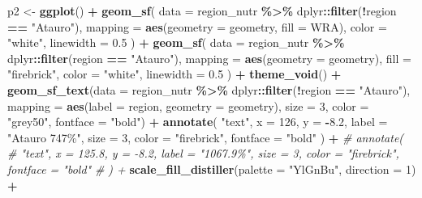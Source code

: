 \documentclass[
]{book}
\newenvironment{Shaded}{\begin{snugshade}}{\end{snugshade}}
\newcommand{\AttributeTok}[1]{\textcolor[rgb]{0.13,0.29,0.53}{#1}}
\newcommand{\CommentTok}[1]{\textcolor[rgb]{0.56,0.35,0.01}{\textit{#1}}}
\newcommand{\DecValTok}[1]{\textcolor[rgb]{0.00,0.00,0.81}{#1}}
\newcommand{\FloatTok}[1]{\textcolor[rgb]{0.00,0.00,0.81}{#1}}
\newcommand{\FunctionTok}[1]{\textcolor[rgb]{0.13,0.29,0.53}{\textbf{#1}}}
\newcommand{\NormalTok}[1]{#1}
\newcommand{\OtherTok}[1]{\textcolor[rgb]{0.56,0.35,0.01}{#1}}
\newcommand{\SpecialCharTok}[1]{\textcolor[rgb]{0.81,0.36,0.00}{\textbf{#1}}}
\newcommand{\StringTok}[1]{\textcolor[rgb]{0.31,0.60,0.02}{#1}}
\begin{document}
\begin{Shaded}
\begin{Highlighting}[]
\NormalTok{p2 }\OtherTok{\textless{}{-}} 
  \FunctionTok{ggplot}\NormalTok{() }\SpecialCharTok{+}
  \FunctionTok{geom\_sf}\NormalTok{(}
    \AttributeTok{data =}\NormalTok{ region\_nutr }\SpecialCharTok{\%\textgreater{}\%}
\NormalTok{      dplyr}\SpecialCharTok{::}\FunctionTok{filter}\NormalTok{(}\SpecialCharTok{!}\NormalTok{region }\SpecialCharTok{==} \StringTok{"Atauro"}\NormalTok{), }\AttributeTok{mapping =} \FunctionTok{aes}\NormalTok{(}\AttributeTok{geometry =}\NormalTok{ geometry, }\AttributeTok{fill =}\NormalTok{ WRA),}
    \AttributeTok{color =} \StringTok{"white"}\NormalTok{, }\AttributeTok{linewidth =} \FloatTok{0.5}
\NormalTok{  ) }\SpecialCharTok{+}
  \FunctionTok{geom\_sf}\NormalTok{(}
    \AttributeTok{data =}\NormalTok{ region\_nutr }\SpecialCharTok{\%\textgreater{}\%}
\NormalTok{      dplyr}\SpecialCharTok{::}\FunctionTok{filter}\NormalTok{(region }\SpecialCharTok{==} \StringTok{"Atauro"}\NormalTok{), }\AttributeTok{mapping =} \FunctionTok{aes}\NormalTok{(}\AttributeTok{geometry =}\NormalTok{ geometry), }\AttributeTok{fill =} \StringTok{"firebrick"}\NormalTok{,}
    \AttributeTok{color =} \StringTok{"white"}\NormalTok{, }\AttributeTok{linewidth =} \FloatTok{0.5}
\NormalTok{  ) }\SpecialCharTok{+}
  \FunctionTok{theme\_void}\NormalTok{() }\SpecialCharTok{+}
  \FunctionTok{geom\_sf\_text}\NormalTok{(}\AttributeTok{data =}\NormalTok{ region\_nutr }\SpecialCharTok{\%\textgreater{}\%}
\NormalTok{                 dplyr}\SpecialCharTok{::}\FunctionTok{filter}\NormalTok{(}\SpecialCharTok{!}\NormalTok{region }\SpecialCharTok{==} \StringTok{"Atauro"}\NormalTok{), }\AttributeTok{mapping =} \FunctionTok{aes}\NormalTok{(}\AttributeTok{label =}\NormalTok{ region, }\AttributeTok{geometry =}\NormalTok{ geometry), }\AttributeTok{size =} \DecValTok{3}\NormalTok{, }\AttributeTok{color =} \StringTok{"grey50"}\NormalTok{, }\AttributeTok{fontface =} \StringTok{"bold"}\NormalTok{) }\SpecialCharTok{+}
  \FunctionTok{annotate}\NormalTok{(}
    \StringTok{"text"}\NormalTok{,}
    \AttributeTok{x =} \DecValTok{126}\NormalTok{, }\AttributeTok{y =} \SpecialCharTok{{-}}\FloatTok{8.2}\NormalTok{, }\AttributeTok{label =} \StringTok{"Atauro 747\%"}\NormalTok{, }\AttributeTok{size =} \DecValTok{3}\NormalTok{, }\AttributeTok{color =} \StringTok{"firebrick"}\NormalTok{, }\AttributeTok{fontface =} \StringTok{"bold"}
\NormalTok{  ) }\SpecialCharTok{+}
  \CommentTok{\# annotate(}
  \CommentTok{\#  "text", x = 125.8, y = {-}8.2, label = "1067.9\%", size = 3, color = "firebrick", fontface = "bold"}
  \CommentTok{\# ) +}
  \FunctionTok{scale\_fill\_distiller}\NormalTok{(}\AttributeTok{palette =} \StringTok{"YlGnBu"}\NormalTok{, }\AttributeTok{direction =} \DecValTok{1}\NormalTok{) }\SpecialCharTok{+}

\end{Highlighting}
\end{Shaded}
\end{document}
